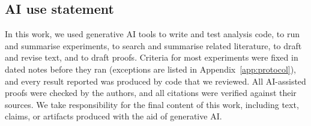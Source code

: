 \documentclass[twoside]{article}
\theoremstyle{definition}
\theoremstyle{remark}
\newcommand{\1}{\mathbf{1}}
\begin{document}
\subsection*{AI use statement}
In this work, we used generative AI tools to write and test analysis code, to run and summarise
experiments, to search and summarise related literature, to draft and revise text, and to draft
proofs. Criteria for most experiments were fixed in dated notes before they ran (exceptions are
listed in Appendix~\ref{app:protocol}), and every result reported was produced by code that we
reviewed. All AI-assisted proofs were checked by the
authors, and all citations were verified against their sources. We take responsibility for the
final content of this work, including text, claims, or artifacts produced with the aid of
generative AI.



\end{document}
